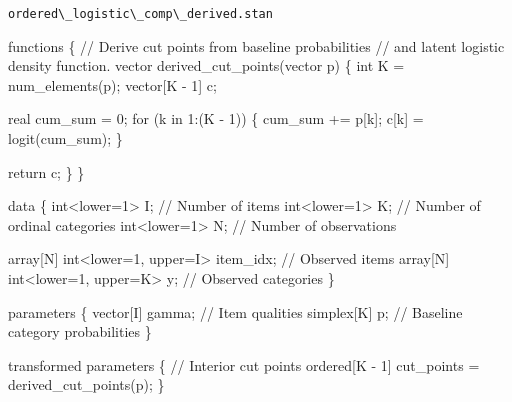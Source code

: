 \documentclass[
  letterpaper,
  DIV=11,
  numbers=noendperiod]{scrartcl}
\newenvironment{Shaded}{\begin{snugshade}}{\end{snugshade}}
\newcommand{\CommentTok}[1]{\textcolor[rgb]{0.37,0.37,0.37}{#1}}
\newcommand{\ControlFlowTok}[1]{\textcolor[rgb]{0.00,0.23,0.31}{#1}}
\newcommand{\DataTypeTok}[1]{\textcolor[rgb]{0.68,0.00,0.00}{#1}}
\newcommand{\DecValTok}[1]{\textcolor[rgb]{0.68,0.00,0.00}{#1}}
\newcommand{\KeywordTok}[1]{\textcolor[rgb]{0.00,0.23,0.31}{#1}}
\newcommand{\NormalTok}[1]{\textcolor[rgb]{0.00,0.23,0.31}{#1}}
\begin{document}
\begin{codelisting}

\caption{\texttt{ordered\textbackslash\_logistic\textbackslash\_comp\textbackslash\_derived.stan}}

\begin{Shaded}
\begin{Highlighting}[]
\KeywordTok{functions}\NormalTok{ \{}
  \CommentTok{// Derive cut points from baseline probabilities}
  \CommentTok{// and latent logistic density function.}
  \DataTypeTok{vector}\NormalTok{ derived\_cut\_points(}\DataTypeTok{vector}\NormalTok{ p) \{}
    \DataTypeTok{int}\NormalTok{ K = num\_elements(p);}
    \DataTypeTok{vector}\NormalTok{[K {-} }\DecValTok{1}\NormalTok{] c;}

    \DataTypeTok{real}\NormalTok{ cum\_sum = }\DecValTok{0}\NormalTok{;}
    \ControlFlowTok{for}\NormalTok{ (k }\ControlFlowTok{in} \DecValTok{1}\NormalTok{:(K {-} }\DecValTok{1}\NormalTok{)) \{}
\NormalTok{      cum\_sum += p[k];}
\NormalTok{      c[k] = logit(cum\_sum);}
\NormalTok{    \}}

    \ControlFlowTok{return}\NormalTok{ c;}
\NormalTok{  \}}
\NormalTok{\}}

\KeywordTok{data}\NormalTok{ \{}
  \DataTypeTok{int}\NormalTok{\textless{}}\KeywordTok{lower}\NormalTok{=}\DecValTok{1}\NormalTok{\textgreater{} I;                   }\CommentTok{// Number of items}
  \DataTypeTok{int}\NormalTok{\textless{}}\KeywordTok{lower}\NormalTok{=}\DecValTok{1}\NormalTok{\textgreater{} K;                   }\CommentTok{// Number of ordinal categories}
  \DataTypeTok{int}\NormalTok{\textless{}}\KeywordTok{lower}\NormalTok{=}\DecValTok{1}\NormalTok{\textgreater{} N;                   }\CommentTok{// Number of observations}

  \DataTypeTok{array}\NormalTok{[N] }\DataTypeTok{int}\NormalTok{\textless{}}\KeywordTok{lower}\NormalTok{=}\DecValTok{1}\NormalTok{, }\KeywordTok{upper}\NormalTok{=I\textgreater{} item\_idx; }\CommentTok{// Observed items}
  \DataTypeTok{array}\NormalTok{[N] }\DataTypeTok{int}\NormalTok{\textless{}}\KeywordTok{lower}\NormalTok{=}\DecValTok{1}\NormalTok{, }\KeywordTok{upper}\NormalTok{=K\textgreater{} y;        }\CommentTok{// Observed categories}
\NormalTok{\}}

\KeywordTok{parameters}\NormalTok{ \{}
  \DataTypeTok{vector}\NormalTok{[I] gamma; }\CommentTok{// Item qualities}
  \DataTypeTok{simplex}\NormalTok{[K] p;    }\CommentTok{// Baseline category probabilities}
\NormalTok{\}}

\KeywordTok{transformed parameters}\NormalTok{ \{}
  \CommentTok{// Interior cut points}
  \DataTypeTok{ordered}\NormalTok{[K {-} }\DecValTok{1}\NormalTok{] cut\_points = derived\_cut\_points(p);}
\NormalTok{\}}


\end{Highlighting}
\end{Shaded}
\end{codelisting}
\end{document}
